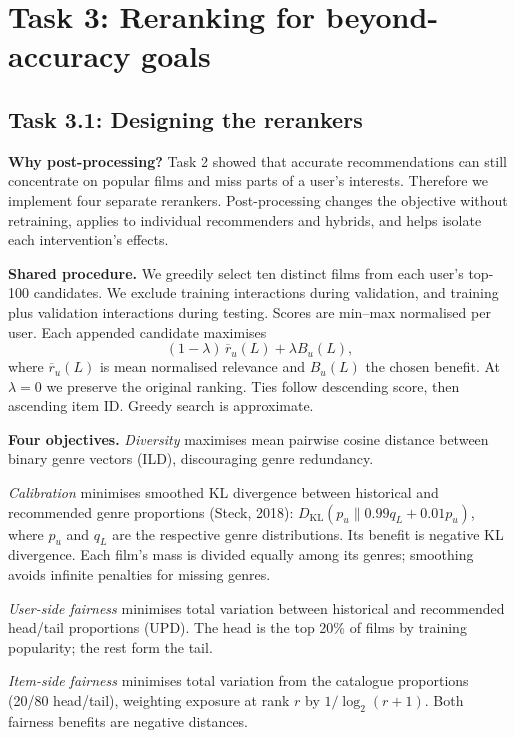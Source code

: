\documentclass[12pt,a4paper]{article}   %
\begin{document}
\newpage
\section{Task 3: Reranking for beyond-accuracy goals}
\subsection{Task 3.1: Designing the rerankers}

\textbf{Why post-processing?}
Task 2 showed that accurate recommendations can still concentrate on popular films and miss parts of a user's interests. Therefore we implement four separate rerankers. Post-processing changes the objective without retraining, applies to individual recommenders and hybrids, and helps isolate each intervention's effects.

\textbf{Shared procedure.}
We greedily select ten distinct films from each user's top-100 candidates. We exclude training interactions during validation, and training plus validation interactions during testing. Scores are min--max normalised per user. Each appended candidate maximises
\[
 (1-\lambda)\,\overline{r}_u(L)+\lambda B_u(L),
\]
where $\overline{r}_u(L)$ is mean normalised relevance and $B_u(L)$ the chosen benefit. At $\lambda=0$ we preserve the original ranking. Ties follow descending score, then ascending item ID. Greedy search is approximate.

\textbf{Four objectives.}
\emph{Diversity} maximises mean pairwise cosine distance between binary genre vectors (ILD), discouraging genre redundancy.

\emph{Calibration} minimises smoothed KL divergence between historical and recommended genre proportions (Steck, 2018): $D_{\mathrm{KL}}(p_u\|0.99q_L+0.01p_u)$, where $p_u$ and $q_L$ are the respective genre distributions. Its benefit is negative KL divergence. Each film's mass is divided equally among its genres; smoothing avoids infinite penalties for missing genres.

\emph{User-side fairness} minimises total variation between historical and recommended head/tail proportions (UPD). The head is the top 20\% of films by training popularity; the rest form the tail.

\emph{Item-side fairness} minimises total variation from the catalogue proportions (20/80 head/tail), weighting exposure at rank $r$ by $1/\log_2(r+1)$. Both fairness benefits are negative distances.
\end{document}
